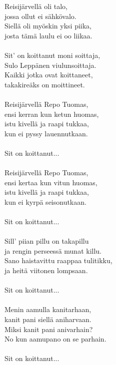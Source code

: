 
            Reisijärvellä oli talo,  \\
            jossa ollut ei sähkövalo.  \\
            Siellä oli myöskin yksi piika,  \\
            josta tämä laulu ei oo liikaa.  \\
\hspace{10mm} \\
            Sit' on koittanut moni soittaja,  \\
            Sulo Leppänen viulunsoittaja.  \\
            Kaikki jotka ovat koittaneet,  \\
            takakireäks on moittineet. \\
\hspace{10mm} \\
            Reisijärvellä Repo Tuomas,  \\
            ensi kerran kun ketun huomas,  \\
            istu kivellä ja raapi tukkaa,  \\
            kun ei pyssy lauennutkaan. \\
\hspace{10mm} \\
            Sit on koittanut... \\
\hspace{10mm} \\
            Reisijärvellä Repo Tuomas,  \\
            ensi kertaa kun vitun huomas,  \\
            istu kivellä ja raapi tukkaa,  \\
            kun ei kyrpä seisonutkaan. \\
\hspace{10mm} \\
            Sit on koittanut... \\
\hspace{10mm} \\
            Sill' piian pillu on takapillu  \\
            ja rengin perseessä munat killu.  \\
            Sano haistavittu raappaa tulitikku,  \\
            ja heitä viitonen lompsaan. \\
\hspace{10mm} \\
            Sit on koittanut... \\
\hspace{10mm} \\
            Menin aamulla kanitarhaan,  \\
            kanit pani siellä aniharvaan.  \\
            Miksi kanit pani anivarhain?  \\
            No kun aamupano on se parhain. \\
\hspace{10mm} \\
            Sit on koittanut... \\
